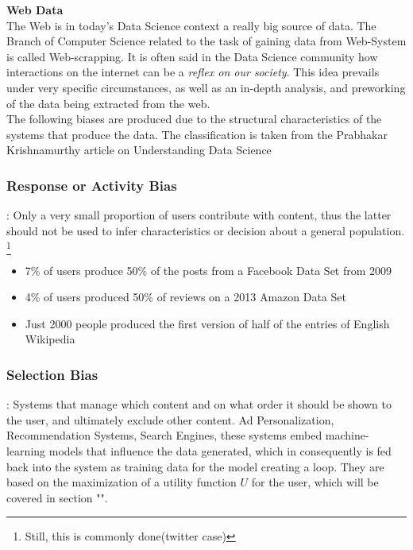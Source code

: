 \textbf{Web Data}\\
The Web is in today's Data Science context a really big source of data. The Branch of Computer Science related to the task of gaining data from Web-System is called Web-scrapping. It is often said in the Data Science community how interactions on the internet can be a \textsl{reflex on our society}. This idea prevails under very specific circumstances, as well as an in-depth analysis, and preworking of the data being extracted from the web.\\
The following biases are produced due to the structural characteristics of the systems that produce the data. The classification is taken from the Prabhakar Krishnamurthy article on Understanding Data Science \cite{Kris19}
\\
\subsubsection{Response or Activity Bias}:
Only a very small proportion of users contribute with content, thus the latter should not be used to infer characteristics or decision about a general population. \footnote{Still, this is commonly done(twitter case)}
\begin{itemize}
  \item 7\% of users produce 50\% of the posts from a Facebook Data Set from 2009
  \item 4\% of users produced 50\% of reviews on a 2013 Amazon Data Set
  \item Just 2000 people produced the first version of half of the entries of English Wikipedia\cite{Baez18}

\end{itemize}

\subsubsection{Selection Bias}:
Systems that manage which content and on what order it should be shown to the user, and ultimately exclude other content. Ad Personalization, Recommendation Systems, Search Engines, these systems embed machine-learning models that influence the data generated, which in consequently is fed back into the system as training data for the model creating a loop. They are based on the maximization of a  utility function $U$ for the user, which will be covered in section "".\\

